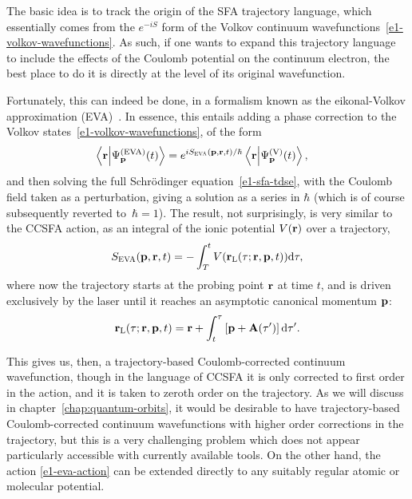 The basic idea is to track the origin of the SFA trajectory language, which essentially comes from the $e^{-iS}$ form of the Volkov continuum wavefunctions~\eqref{e1-volkov-wavefunctions}. As such, if one wants to expand this trajectory language to include the effects of the Coulomb potential on the continuum electron, the best place to do it is directly at the level of its original wavefunction.

Fortunately, this can indeed be done, in a formalism known as the eikonal-Volkov approximation (EVA)~\cite{eikonalVolkov_prelim, eikonalVolkov_initial}. In essence, this entails adding a phase correction to the Volkov states~\eqref{e1-volkov-wavefunctions}, of the form 
\begin{align}
\braket{\vb{r}}{\Psi_{\vb{p}}^{\mathrm{(EVA)}}(t)}
& = 
e^{iS_\textsc{EVA}(\vb{p},\vb{r},t)/\hbar}
\braket{\vb{r}}{\Psi_{\vb{p}}^{\mathrm{(V)}}(t)}
,
\label{e1-eikonal-volkov-essential-ansatz}
\end{align}
and then solving the full Schrödinger equation~\eqref{e1-sfa-tdse}, with the Coulomb field taken as a perturbation, giving a solution as a series in $\hbar$ (which is of course subsequently reverted to~$\hbar=1$). The result, not surprisingly, is very similar to the CCSFA action, as an integral of the ionic potential $V(\vb{r})$ over a trajectory,
\begin{equation}
S_\textsc{EVA}(\vb{p},\vb{r},t) = -\int_T^t V(\vb{r}_\mathrm{L}(\tau;\vb{r},\vb{p},t))\mathrm{d}\tau
,
\label{e1-eva-action}
\end{equation}
where now the trajectory starts at the probing point $\vb{r}$ at time $t$, and is driven exclusively by the laser until it reaches an asymptotic canonical momentum $\vb{p}$:
\begin{equation}
\vb{r}_\mathrm{L}(\tau;\vb{r},\vb{p},t)
=
\vb{r}+\int_t^\tau \left[\vb{p}+\vb{A}(\tau')\right]\mathrm{d}\tau'
.
\label{e1-eva-trajectory}
\end{equation}


This gives us, then, a trajectory-based Coulomb-corrected continuum wavefunction, though in the language of CCSFA it is only corrected to first order in the action, and it is taken to zeroth order on the trajectory. As we will discuss in chapter~\ref{chap:quantum-orbits}, it would be desirable to have trajectory-based Coulomb-corrected continuum wavefunctions with higher order corrections in the trajectory, but this is a very challenging problem which does not appear particularly accessible with currently available tools. On the other hand, the action \eqref{e1-eva-action} can be extended directly to any suitably regular atomic or molecular potential.

